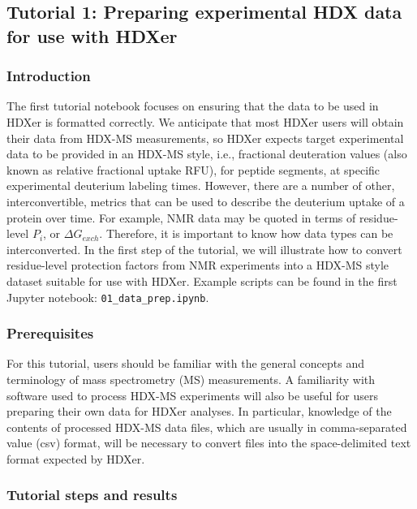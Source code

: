 \documentclass[9pt,tutorial]{livecoms}
\begin{document}
\subsection{Tutorial 1: Preparing experimental HDX data for use with HDXer}\label{tutorial_1}

\subsubsection{Introduction}
The first tutorial notebook focuses on ensuring that the data to be used in HDXer is formatted correctly. 
We anticipate that most HDXer users will obtain their data from HDX-MS measurements, so HDXer expects target experimental data to be provided in an HDX-MS style, i.e., fractional deuteration values (also known as relative fractional uptake RFU), for peptide segments, at specific experimental deuterium labeling times. 
However, there are a number of other, interconvertible, metrics that can be used to describe the deuterium uptake of a protein over time. 
For example, NMR data may be quoted in terms of residue-level $P_i$, or $\Delta{G_{exch}}$. 
Therefore, it is important to know how data types can be interconverted. 
In the first step of the tutorial, we will illustrate how to convert residue-level protection factors from NMR experiments into a HDX-MS style dataset suitable for use with HDXer. 
Example scripts can be found in the first Jupyter notebook: \texttt{01\_data\_prep.ipynb}.

\subsubsection{Prerequisites}
For this tutorial, users should be familiar with the general concepts and terminology of mass spectrometry (MS) measurements. 
A familiarity with software used to process HDX-MS experiments will also be useful for users preparing their own data for HDXer analyses.
In particular, knowledge of the contents of processed HDX-MS data files, which are usually in comma-separated value (csv) format, will be necessary to convert files into the space-delimited text format expected by HDXer.

\subsubsection{Tutorial steps and results}
\end{document}
